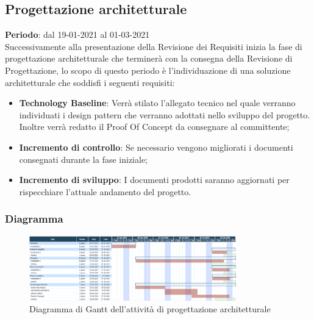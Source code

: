 	\subsection{Progettazione architetturale}
	\textbf{Periodo}: dal 19-01-2021 al 01-03-2021 \\
	Successivamente alla presentazione della Revisione dei Requisiti inizia la fase di progettazione architetturale che terminerà con la consegna della Revisione di Progettazione, lo scopo di questo periodo è l'individuazione di una soluzione architetturale che soddisfi i seguenti requisiti:
	\begin{itemize}
		\item \textbf{Technology Baseline}: Verrà stilato l'allegato tecnico nel quale verranno individuati i design pattern che verranno adottati nello sviluppo del progetto. Inoltre verrà redatto il Proof Of Concept da consegnare al committente;
		\item \textbf{Incremento di controllo}: Se necessario vengono migliorati i documenti consegnati durante la fase iniziale;
		\item \textbf{Incremento di sviluppo}: I documenti prodotti saranno aggiornati per rispecchiare l'attuale andamento del progetto.
	\end{itemize}
	
	\subsubsection{Diagramma}
		\begin{figure}[H]
        		\centering
        		\includegraphics[width=0.8\textwidth]{source/img/Progettazione_architetturale.png}
        		\caption{Diagramma di Gantt dell'attività di progettazione architetturale}
    		\end{figure}
